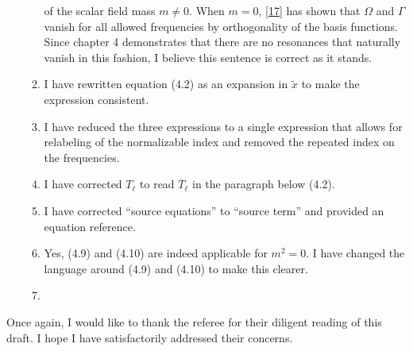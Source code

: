 \documentclass[11pt,letterpaper]{article}
\begin{document}
\begin{enumerate}
\begin{enumerate}
        of the scalar field mass $m \neq 0$. When $m = 0$, [\href{https://arxiv.org/pdf/1407.6273.pdf}{17}]
        has shown that $\Omega$ and $\Gamma$ vanish for all allowed frequencies by orthogonality of the 
        basis functions. Since chapter 4 demonstrates that there are no resonances that naturally 
        vanish in this fashion, I believe this sentence is correct as it stands.
        \item I have rewritten equation (4.2) as an expansion in $\tilde x$ to make the expression consistent.
        \item I have reduced the three expressions to a single expression that allows for relabeling of the normalizable index and removed the repeated index on the frequencies.
        \item I have corrected $T_\ell$ to read $\overline{T}_\ell$ in the paragraph below (4.2).
        \item I have corrected ``source equations'' to ``source term'' and provided an equation reference.
        \item Yes, (4.9) and (4.10) are indeed applicable for $m^2 = 0$. I have changed the language around (4.9) and (4.10) to make this clearer.
        \item
    \end{enumerate}   
\end{enumerate}

Once again, I would like to thank the referee for their diligent reading of this draft. I hope I have satisfactorily addressed their concerns. 
\end{document}

